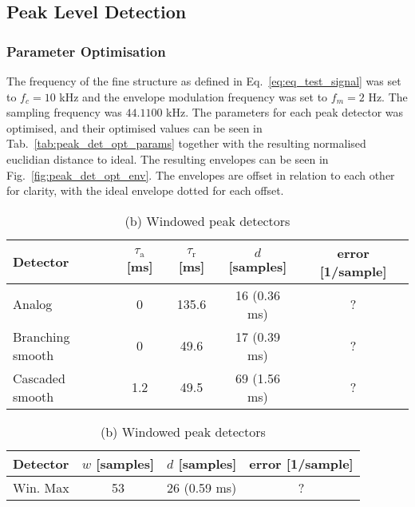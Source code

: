\documentclass[../main2.tex]{subfiles}
\begin{document}
\subsection{Peak Level Detection}

\subsubsection{Parameter Optimisation}
The frequency of the fine structure as defined in Eq.~\eqref{eq:eq_test_signal} was set to $f_c = 10$ kHz and the envelope modulation frequency was set to $f_m = 2$ Hz. The sampling frequency was $44.1100$ kHz. The parameters for each peak detector was optimised, and their optimised values can be seen in Tab.~\ref{tab:peak_det_opt_params} together with the resulting normalised euclidian distance to ideal. The resulting envelopes can be seen in Fig.~\ref{fig:peak_det_opt_env}. The envelopes are offset in relation to each other for clarity, with the ideal envelope dotted for each offset. 

\begin{table}[h]
\begin{center}
\caption{Optimised parameters for the various peak detectors, $f_c=10 $  kHz, $f_m=2 $}
\label{tab:peak_det_opt_params}
\caption*{(a) Attack and release peak detectors}
\begin{tabular}{| l | c c c | c |}
	\hline
	Detector 	& $\tau_\text{a}$ [ms] & $\tau_\text{r}$ [ms] & $d$ [samples] & error [1/sample]\\
	\hline
	
	Analog 			& 0 			& 135.6 	& 16	(0.36 ms)	& ?	\\ 
	Branching smooth 	& 0	 		& 49.6 	& 17	(0.39 ms)	& ?	\\ 
	Cascaded smooth	& 1.2		& 49.5 	& 69	(1.56 ms)	& ?	\\
	\hline
\end{tabular}
\end{center}

\begin{center}
\caption*{(b) Windowed peak detectors}
\label{tab:peak_det_instatt_opt_params}
 \begin{tabular}{| l | c c  | c |}
	\hline
	Detector & $w$ [samples] & $d$ [samples] & error [1/sample] \\
	\hline
	Win. Max		& 53		& 26	(0.59 ms)	& ?	\\ 
	\hline
\end{tabular}
\end{center}

\end{table}
\end{document}
